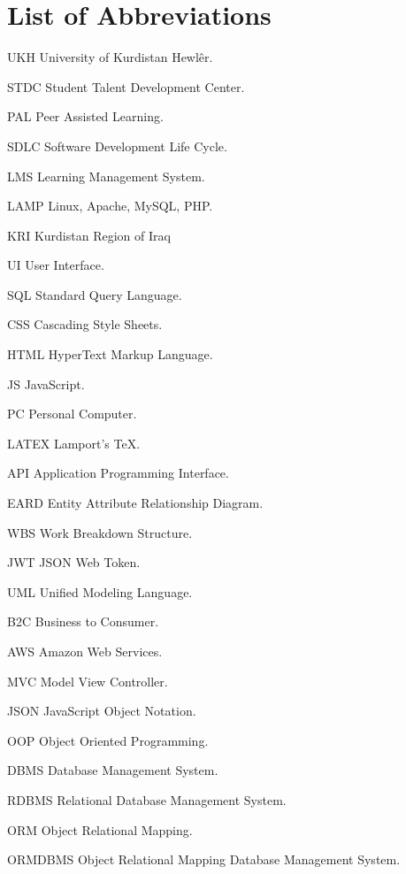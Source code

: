 \chapter*{List of Abbreviations}

\begin{leftitemize}
    \item[UKH]  University of Kurdistan Hewlêr.
    \item[STDC] Student Talent Development Center.
    \item[PAL]  Peer Assisted Learning.
    \item[SDLC] Software Development Life Cycle.
    \item[LMS]  Learning Management System.
    \item[LAMP] Linux, Apache, MySQL, PHP.
    \item[KRI] Kurdistan Region of Iraq
    \item[UI]   User Interface.
    \item[SQL] Standard Query Language.
    \item[CSS] Cascading Style Sheets.
    \item[HTML] HyperText Markup Language.
    \item[JS] JavaScript.
    \item[PC] Personal Computer.
    \item[LATEX] Lamport's TeX.
    \item[API] Application Programming Interface.
    \item[EARD] Entity Attribute Relationship Diagram.
    \item[WBS] Work Breakdown Structure.
    \item[JWT] JSON Web Token.
    \item[UML] Unified Modeling Language.
    \item[B2C] Business to Consumer.
    \item[AWS] Amazon Web Services.
    \item[MVC] Model View Controller.
    \item[JSON] JavaScript Object Notation.
    \item[OOP] Object Oriented Programming.
    \item[DBMS] Database Management System.
    \item[RDBMS] Relational Database Management System.
    \item[ORM] Object Relational Mapping.
    \item[ORMDBMS] Object Relational Mapping Database Management System.

\end{leftitemize}
